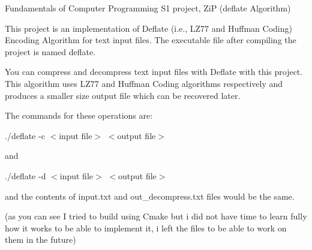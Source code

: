 Fundamentals of Computer Programming S1 project, ZiP (deflate Algorithm)

This project is an implementation of Deflate (i.\+e., LZ77 and Huffman Coding) Encoding Algorithm for text input files. The executable file after compiling the project is named deflate.

You can compress and decompress text input files with Deflate with this project. This algorithm uses LZ77 and Huffman Coding algorithms respectively and produces a smaller size output file which can be recovered later.

The commands for these operations are\+:

./deflate -\/c $<$input file$>$ $<$output file$>$

and

./deflate -\/d $<$input file$>$ $<$output file$>$

and the contents of input.\+txt and out\+\_\+decompress.\+txt files would be the same.

(as you can see I tried to build using Cmake but i did not have time to learn fully how it works to be able to implement it, i left the files to be able to work on them in the future) 